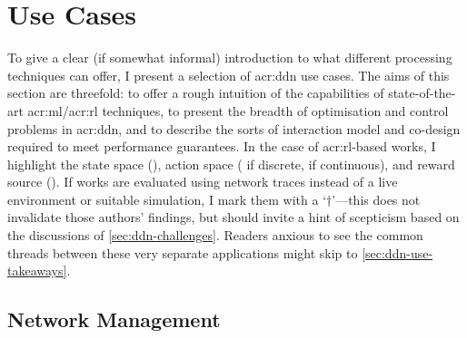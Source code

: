 \section{Use Cases}\label{sec:use-cases}
To give a clear (if somewhat informal) introduction to what different processing techniques can offer, I present a selection of \gls{acr:ddn} use cases.
The aims of this section are threefold: to offer a rough intuition of the capabilities of state-of-the-art \gls{acr:ml}/\gls{acr:rl} techniques, to present the breadth of optimisation and control problems in \gls{acr:ddn}, and to describe the sorts of interaction model and co-design required to meet performance guarantees.
In the case of \gls{acr:rl}-based works, I highlight the state space (\rllitstate), action space (\rllitact{} if discrete, \rllitactreal{} if continuous), and reward source (\rllitreward).
If works are evaluated using network traces instead of a live environment or suitable simulation, I mark them with a `$\dagger$'---this does not invalidate those authors' findings, but should invite a hint of scepticism based on the discussions of \cref{sec:ddn-challenges}.
Readers anxious to see the common threads between these very separate applications might skip to \cref{sec:ddn-use-takeaways}.
%
%
%
%
%
%


\subsection{Network Management}

